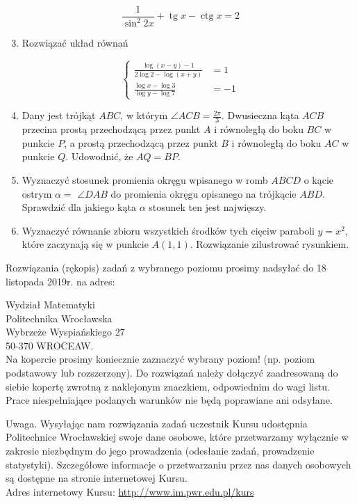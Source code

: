 \documentclass[10pt]{article}
\begin{document}
$$
\frac{1}{\sin ^{2} 2 x}+\operatorname{tg} x-\operatorname{ctg} x=2
$$

\begin{enumerate}
  \setcounter{enumi}{2}
  \item Rozwiązać układ równań
\end{enumerate}

$$
\begin{cases}\frac{\log (x-y)-1}{2 \log 2-\log (x+y)} & =1 \\ \frac{\log x-\log 3}{\log y-\log 7} & =-1\end{cases}
$$

\begin{enumerate}
  \setcounter{enumi}{3}
  \item Dany jest trójkąt $A B C$, w którym $\angle A C B=\frac{2 \pi}{3}$. Dwusieczna kąta $A C B$ przecina prostą przechodzącą przez punkt $A$ i równoległą do boku $B C$ w punkcie $P$, a prostą przechodzącą przez punkt $B$ i równoległą do boku $A C$ w punkcie $Q$. Udowodnić, że $A Q=B P$.
  \item Wyznaczyć stosunek promienia okręgu wpisanego w romb $A B C D$ o kącie ostrym $\alpha=$ $\angle D A B$ do promienia okręgu opisanego na trójkącie $A B D$. Sprawdzić dla jakiego kąta $\alpha$ stosunek ten jest najwięszy.
  \item Wyznaczyć równanie zbioru wszystkich środków tych cięciw paraboli $y=x^{2}$, które zaczynają się w punkcie $A(1,1)$. Rozwiązanie zilustrować rysunkiem.
\end{enumerate}

Rozwiązania (rękopis) zadań z wybranego poziomu prosimy nadsyłać do 18 listopada 2019r. na adres:

Wydział Matematyki\\
Politechnika Wrocławska\\
Wybrzeże Wyspiańskiego 27\\
50-370 WROCEAW.\\
Na kopercie prosimy koniecznie zaznaczyć wybrany poziom! (np. poziom podstawowy lub rozszerzony). Do rozwiązań należy dołączyć zaadresowaną do siebie kopertę zwrotną z naklejonym znaczkiem, odpowiednim do wagi listu. Prace niespełniające podanych warunków nie będą poprawiane ani odsyłane.

Uwaga. Wysyłając nam rozwiązania zadań uczestnik Kursu udostępnia Politechnice Wrocławskiej swoje dane osobowe, które przetwarzamy wyłącznie w zakresie niezbędnym do jego prowadzenia (odesłanie zadań, prowadzenie statystyki). Szczegółowe informacje o przetwarzaniu przez nas danych osobowych są dostępne na stronie internetowej Kursu.\\
Adres internetowy Kursu: \href{http://www.im.pwr.edu.pl/kurs}{http://www.im.pwr.edu.pl/kurs}
\end{document}
